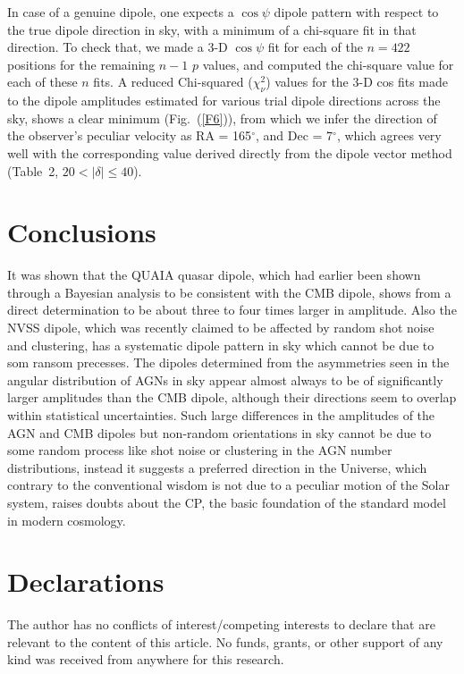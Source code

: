 \documentclass[fleqn,usenatbib]{mnras}
\begin{document}
In case of a genuine dipole, one expects a  $\cos\psi$ dipole pattern with respect to the true dipole direction in sky, with a minimum of a  chi-square fit in that direction. 
To check that, we made a 3-D $\cos\psi$ fit for each of the $n=422$ positions for the remaining $n-1$ $p$ values, and computed the chi-square value for each of these $n$ fits. 
A reduced Chi-squared ($\chi^2_\nu$) values for the 3-D  cos fits  made to the dipole amplitudes estimated for various trial dipole directions across the sky, shows a clear minimum  (Fig.~(\ref{F6})), from which we infer the direction of the observer's peculiar velocity as RA = 165$^{\circ}$, and Dec = 7$^{\circ}$, which agrees very well with the corresponding value  derived directly from the dipole vector method (Table~2, $20<|{\delta}|\leq40$).

\section{Conclusions}
It was shown that the QUAIA quasar dipole, which had earlier been shown through a Bayesian analysis to be consistent with the CMB dipole, shows from a direct determination to be about three to four times larger in amplitude. Also the NVSS dipole, which was recently claimed to be affected by random shot noise and clustering, has a systematic dipole pattern in sky which cannot be due to som ransom precesses.  The dipoles determined from the asymmetries seen in the angular distribution of AGNs in sky appear almost always to be of significantly larger amplitudes than the CMB dipole, although their directions seem to overlap  within statistical uncertainties. Such large differences in the amplitudes of the AGN and CMB dipoles but non-random orientations in sky cannot be due to some random process like shot noise or clustering in the AGN number distributions, instead it  suggests a preferred direction in the Universe, which contrary to the conventional wisdom is not due to a peculiar motion of the Solar system, raises doubts about the CP, the basic foundation of the standard model in modern cosmology.
\section*{Declarations}
The author has no conflicts of interest/competing interests to declare that are relevant to the content of this article. No funds, grants, or other support of any kind was received from anywhere for this research.
\end{document}
